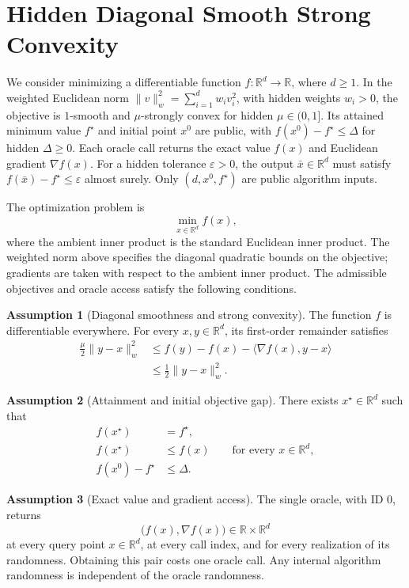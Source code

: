 \documentclass[10pt]{article}
\theoremstyle{definition}
\newtheorem{assumption}{Assumption}
\begin{document}
\section*{Hidden Diagonal Smooth Strong Convexity}
We consider minimizing a differentiable function $f:\mathbb{R}^d\to\mathbb{R}$, where $d\geq1$. In the weighted Euclidean norm $\|v\|_w^2=\sum_{i=1}^d w_i v_i^2$, with hidden weights $w_i>0$, the objective is $1$-smooth and $\mu$-strongly convex for hidden $\mu\in(0,1]$. Its attained minimum value $f^\star$ and initial point $x^0$ are public, with $f(x^0)-f^\star\leq\Delta$ for hidden $\Delta\geq0$. Each oracle call returns the exact value $f(x)$ and Euclidean gradient $\nabla f(x)$. For a hidden tolerance $\varepsilon>0$, the output $\bar{x}\in\mathbb{R}^d$ must satisfy $f(\bar{x})-f^\star\leq\varepsilon$ almost surely. Only $(d,x^0,f^\star)$ are public algorithm inputs.

The optimization problem is
\[
\min_{x\in\mathbb{R}^d} f(x),
\]
where the ambient inner product is the standard Euclidean inner product. The weighted norm above specifies the diagonal quadratic bounds on the objective; gradients are taken with respect to the ambient inner product. The admissible objectives and oracle access satisfy the following conditions.

\begin{assumption}[Diagonal smoothness and strong convexity]
The function $f$ is differentiable everywhere. For every $x,y\in\mathbb{R}^d$, its first-order remainder satisfies
\[
\begin{aligned}
\frac{\mu}{2}\|y-x\|_w^2
&\leq f(y)-f(x)-\langle\nabla f(x),y-x\rangle\\
&\leq \frac{1}{2}\|y-x\|_w^2.
\end{aligned}
\]
\end{assumption}

\begin{assumption}[Attainment and initial objective gap]
There exists $x^\star\in\mathbb{R}^d$ such that
\[
\begin{aligned}
f(x^\star)&=f^\star,\\
f(x^\star)&\leq f(x) \qquad\text{for every }x\in\mathbb{R}^d,\\
f(x^0)-f^\star&\leq\Delta.
\end{aligned}
\]
\end{assumption}

\begin{assumption}[Exact value and gradient access]
The single oracle, with ID $0$, returns
\[
\bigl(f(x),\nabla f(x)\bigr)\in\mathbb{R}\times\mathbb{R}^d
\]
at every query point $x\in\mathbb{R}^d$, at every call index, and for every realization of its randomness. Obtaining this pair costs one oracle call. Any internal algorithm randomness is independent of the oracle randomness.
\end{assumption}
\end{document}
